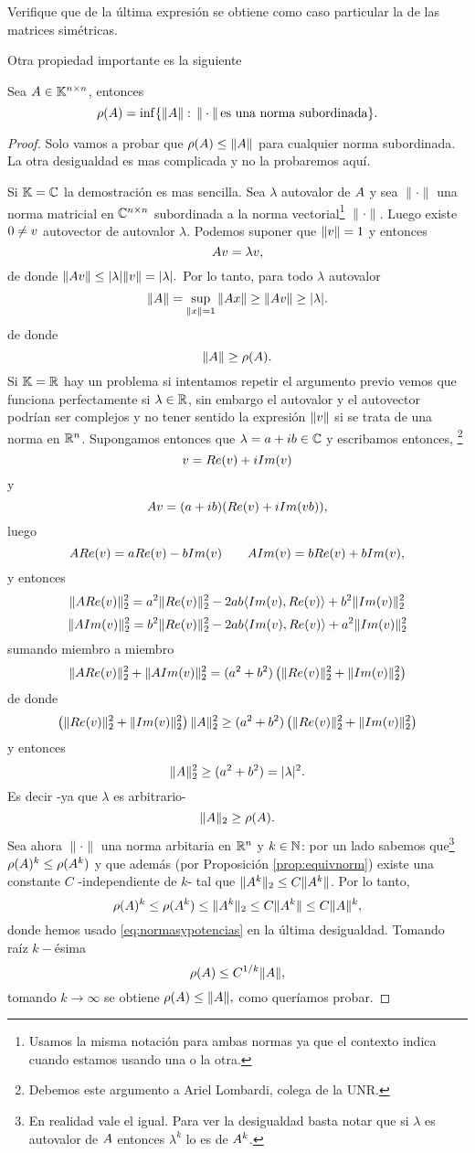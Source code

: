 \etcc
\begin{ej}
 Verifique que de la última expresión se obtiene como caso particular la de las matrices simétricas.
\end{ej}
Otra propiedad importante es la siguiente
\begin{prop}
 \label{prop:infmat=rho}
Sea $\Ab\in\Knn$, entonces
$$
\rho(\Ab)=\inf
\{\|\Ab\|:\, \|\cdot \|\,  \mbox{es una norma subordinada}\}.$$
\end{prop}
\begin{proof}
Solo vamos a probar que  $\rho(\Ab)\le \|\Ab\|$ para cualquier norma subordinada. La otra desigualdad es mas complicada y no la probaremos aquí.

 Si $\mathbb K=\mathbb C$ la demostración es mas sencilla.
 Sea $\lambda$ autovalor de $\Ab$ y sea $\|\cdot\|$ una norma matricial en $\mathbb C^{n\times n}$ subordinada a la norma vectorial\footnote{Usamos la misma notación para ambas normas ya que el contexto indica cuando estamos usando una o la otra.} $\|\cdot\|$. Luego existe $\cero\neq\vb$ autovector de autovalor $\lambda$. Podemos suponer que $\|\vb\|=1$ y entonces
 $$
 \Ab\vb=\lambda\vb,
 $$
 de donde 
 $\|\Ab\vb\|\le |\lambda|\|\vb\|=|\lambda|.$ Por lo tanto, para todo $\lambda$ autovalor
 $$
 \|\Ab\|=\sup_{\|\xb\|=1}\|\Ab\xb\|\ge \|\Ab\vb\|\ge |\lambda|.
 $$
 de donde 
 $$
 \|\Ab\|\ge \rho(\Ab).
 $$
 Si $\mathbb K=\mathbb R$ hay un problema si intentamos repetir el argumento previo vemos que funciona perfectamente si $\lambda \in \mathbb R$, sin embargo el autovalor y el autovector podrían ser complejos y no tener sentido la expresión $\|\vb\|$ si se trata de una norma en $\mathbb R^{n}$.
 Supongamos entonces que $\lambda=a+ib\in \mathbb C$ y escribamos entonces, \footnote{Debemos este argumento a Ariel Lombardi, colega de la UNR.}
$$
\vb=Re(\vb)+iIm(\vb)
$$
y
 $$
 \Ab\vb=(a+ib)(Re(\vb)+iIm(vb)),
 $$
 luego
 $$
 \Ab Re(\vb)=aRe(\vb)-bIm(\vb) \qquad 
 \Ab Im(\vb)=bRe(\vb)+bIm(\vb),
 $$
 y entonces 
 $$
 \|\Ab Re(\vb)\|_2^2=a^2\|Re(\vb)\|_2^2-2ab\langle Im(\vb),Re(\vb)\rangle+b^2\|Im(\vb)\|_2^2 
 $$
 $$
 \|\Ab Im(\vb)\|_2^2=b^2\|Re(\vb)\|_2^2-2ab\langle Im(\vb),Re(\vb)\rangle+a^2\|Im(\vb)\|_2^2 
 $$
 sumando miembro a miembro
 $$\|\Ab Re(\vb)\|_2^2+\|\Ab Im(\vb)\|_2^2=(a^2+b^2)\left(\|Re(\vb)\|_2^2+\|Im(\vb)\|_2^2\right) 
 $$
 de donde
 $$
 \left(\|Re(\vb)\|_2^2+\|Im(\vb)\|_2^2\right)\|\Ab\|_2^2\ge (a^2+b^2)\left(\|Re(\vb)\|_2^2+\|Im(\vb)\|_2^2\right) 
 $$
 y entonces
 $$
 \|\Ab\|_2^2\ge (a^2+b^2)=|\lambda|^2. 
 $$
 Es decir -ya que $\lambda$ es arbitrario- 
 $$\|\Ab\|_2\ge \rho(\Ab).$$
 Sea ahora $\|\cdot\|$ una norma arbitaria en $\mathbb R^{n}$ y $k\in \mathbb N$: por un lado sabemos que\footnote{En realidad vale el igual. Para ver la desigualdad basta notar que si $\lambda$ es autovalor de $ \Ab$ entonces $\lambda^k$ lo es de $\Ab^k$. } 
 $\rho(\Ab)^k\le \rho(\Ab^k)
 $ y que además (por Proposición \ref{prop:equivnorm}) existe una constante $C$ -independiente de $k$- tal que $\|\Ab^k\|_2\le C\|\Ab^k\|$. Por lo tanto,
 $$
 \rho(\Ab)^k\le \rho(\Ab^k)\le \|\Ab^k\|_2\le C\|\Ab^k\|\le C\|\Ab\|^k,
 $$
 donde hemos usado \eqref{eq:normasypotencias} en la última desigualdad. Tomando raíz $k-$ésima
 $$
 \rho(\Ab)\le C^{1/k}\|\Ab\|,
 $$
 tomando $k\to \infty$ se obtiene $
 \rho(\Ab)\le \|\Ab\|,
 $ 
 como queríamos probar.
\end{proof}



